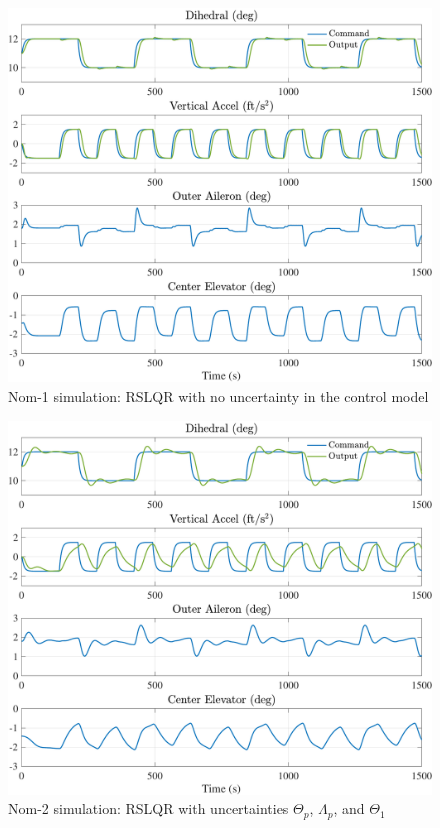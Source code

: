 \documentclass[english]{ifacconf}
\begin{document}
\begin{figure}[htbp]
	\centering
	\includegraphics[width=\columnwidth]{../fig/nom1.pdf}
	\caption{Nom-1 simulation: RSLQR with no uncertainty in the control model}
	\label{fig:nom1}
\end{figure}

\begin{figure}[htbp]
	\centering
	\includegraphics[width=\columnwidth]{../fig/nom2.pdf}
	\caption{Nom-2 simulation: RSLQR with uncertainties $\Theta_p$, $\Lambda_p$, and $\Theta_1$}
	\label{fig:nom2}
\end{figure}
\end{document}
